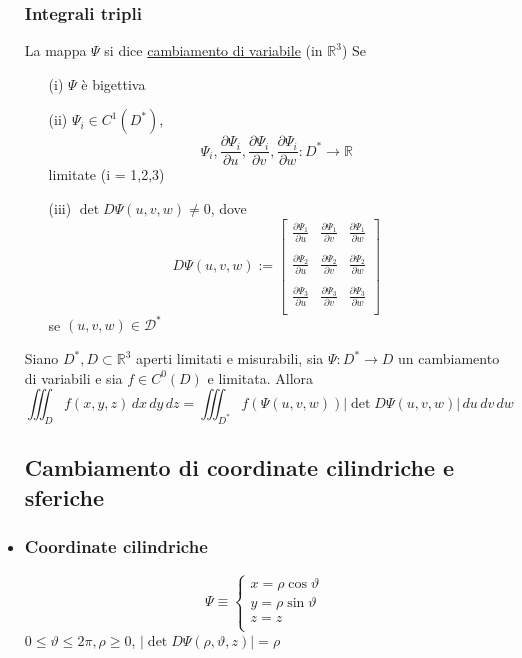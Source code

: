 \documentclass{report}
\newcommand{\ace}{\`e }
\newcommand{\Ins}[1]{\mathbb{#1}}
\newcommand{\R}{\Ins{R}}
\newcommand{\abs}[1]{\left\lvert #1 \right\rvert}
\newcommand{\p}{\partial}
\newcommand{\D}{\mathcal{D}}
\begin{document}
\begin{itemize}
      \subsubsection{Integrali tripli}
      La mappa $\Psi$ si dice \underline{cambiamento di variabile} (in $\R^3$) Se
      \begin{itemize}
        \item[(i)] $\Psi$ \ace bigettiva
        \item[(ii)] $\Psi_i \in C^1(D^*)$, 
                    $$\Psi_i, \frac{\p \Psi_i}{\p u}, \frac{\p \Psi_i}{\p v}, \frac{\p \Psi_i}{\p w} : D^* \to \R$$
                    limitate (i = 1,2,3) 
        \item[(iii)] $\det D\Psi(u,v,w) \neq 0$, dove 
                    $$D\Psi(u,v,w) := \begin{bmatrix}
                      \frac{\p \Psi_1}{\p u} & \frac{\p \Psi_1}{\p v} & \frac{\p \Psi_1}{\p w} \\
                      \\
                      \frac{\p \Psi_2}{\p u} & \frac{\p \Psi_2}{\p v} & \frac{\p \Psi_2}{\p w} \\
                      \\
                      \frac{\p \Psi_3}{\p u} & \frac{\p \Psi_3}{\p v} & \frac{\p \Psi_3}{\p w} \\
                    \end{bmatrix}$$
                    se $(u,v,w)\in\D^*$
      \end{itemize}
      Siano $D^*, D \subset \R^3$ aperti limitati e misurabili, sia 
      $\Psi : D^* \to D$ un cambiamento di variabili e sia $f \in C^0(D)$ e limitata.
      Allora 
      $$\iiint_{D} f(x,y,z) \,dx\,dy\,dz = \iiint_{D^*} f(\Psi(u,v,w)) \abs{\det D\Psi(u,v,w)} \,du\,dv\,dw$$

  \subsection{Cambiamento di coordinate cilindriche e sferiche}
  \item \subsubsection{Coordinate cilindriche}
          $$\Psi \equiv \left\{\begin{array}{l}
            x = \rho\cos\vartheta \\
            y = \rho\sin\vartheta \\
            z = z \\
          \end{array}\right.$$
          $0 \leq \vartheta\leq 2\pi, \rho\geq 0$, $\abs{\det D\Psi(\rho,\vartheta,z)} = \rho$

\end{itemize}
\end{document}
